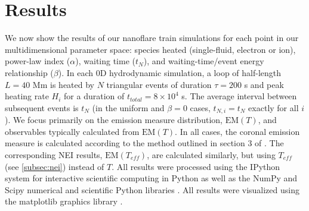 \documentclass[preprint,linenumbers]{aastex}
\begin{document}
	\section{Results}
	\label{sec:results}
	\par We now show the results of our nanoflare train simulations for each point in our multidimensional parameter space: species heated (single-fluid, electron or ion), power-law index ($\alpha$), waiting time ($t_N$), and waiting-time/event energy relationship ($\beta$). In each 0D hydrodynamic simulation, a loop of half-length $L=40$ Mm is heated by $N$ triangular events of duration $\tau=200$ s and peak heating rate $H_i$ for a duration of $t_{total}=8\times10^4$ s. The average interval between subsequent events is $t_N$ (in the uniform and $\beta=0$ cases, $t_{N,i}=t_N$ exactly for all $i$). We focus primarily on the emission measure distribution, $\mathrm{EM}(T)$, and observables typically calculated from $\mathrm{EM}(T)$. In all cases, the coronal emission measure is calculated according to the method outlined in section 3 of . The corresponding NEI results, $\mathrm{EM}(T_{eff})$, are calculated similarly, but using $T_{eff}$ (see \autoref{subsec:nei}) instead of $T$. All results were processed using the IPython system for interactive scientific computing in Python \citep{perez_ipython:_2007} as well as the NumPy and Scipy numerical and scientific Python libraries \citep{van_der_walt_numpy_2011}. All results were visualized using the matplotlib graphics library \citep{hunter_matplotlib:_2007}.
\end{document}
